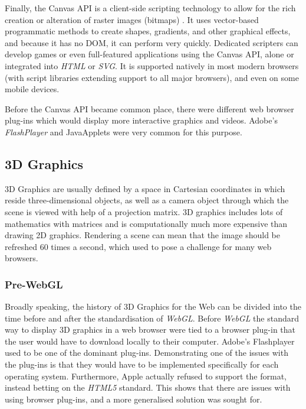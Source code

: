 \documentclass[a4paper,11pt,twoside]{article}
\begin{document}
Finally, the Canvas API is a client-side scripting technology to allow for the rich creation or alteration of raster images (bitmaps) . It uses vector-based programmatic methods to create shapes, gradients, and other graphical effects, and because it has no DOM, it can perform very quickly. Dedicated scripters can develop games or even full-featured applications using the Canvas API, alone or integrated into \textit{HTML} or \textit{SVG}. It is supported natively in most modern browsers (with script libraries extending support to all major browsers), and even on some mobile devices.

Before the Canvas API became common place, there were different web browser plug-ins which would display more interactive graphics and videos. Adobe's \textit{FlashPlayer} and JavaApplets were very common for this purpose.



\subsection{3D Graphics}



3D Graphics are usually defined by a space in Cartesian coordinates in which reside three-dimensional objects, as well as a camera object through which the scene is viewed with help of a projection matrix. 3D graphics includes lots of mathematics with matrices and is computationally much more expensive than drawing 2D graphics. Rendering a scene can mean that the image should be refreshed 60 times a second, which used to pose a challenge for many web browsers.

\subsubsection{Pre-WebGL}

Broadly speaking, the history of 3D Graphics for the Web can be divided into the time before and after the standardisation of \textit{WebGL}. Before \textit{WebGL} the standard way to display 3D graphics in a web browser were tied to a browser plug-in that the user would have to download locally to their computer. Adobe's Flashplayer used to be one of the dominant plug-ins. Demonstrating one of the issues with the plug-ins is that they would have to be implemented specifically for each operating system. Furthermore, Apple actually refused to support the format, instead betting on the \textit{HTML5} standard. This shows that there are issues with using browser plug-ins, and a more generalised solution was sought for.
\end{document}
